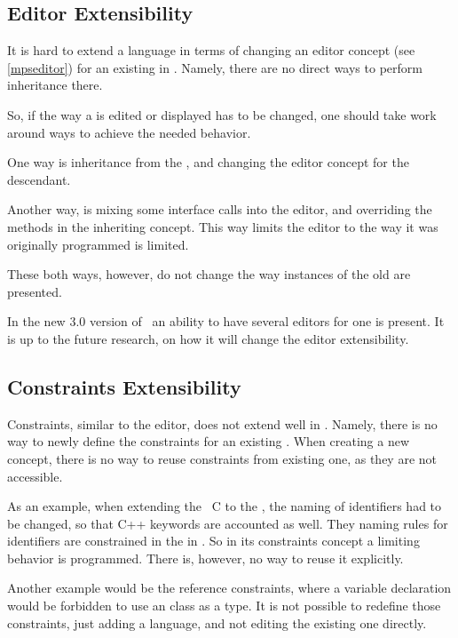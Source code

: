 \subsection{Editor Extensibility} 

It is hard to extend a language in terms of changing an editor concept (see \ref{mpseditor}) for an existing  in \jbmps.
Namely, there are no direct ways to perform inheritance there. 

So, if the way a  is edited or displayed has to be 
changed, one should take work around ways to achieve the needed behavior. 

One way is inheritance from the , and changing the editor concept for the descendant.

Another way, is mixing some interface calls into the editor, and overriding the methods in the inheriting concept.
This way limits the editor to the way it was originally programmed is limited.

These both ways, however, do not change the way instances of the old  are presented.

In the new 3.0 version of \jbmps\ an ability to have several editors for one  is present. It is 
up to the future research, on how it will change the editor extensibility.

\subsection{Constraints Extensibility}

Constraints, similar to the editor, does not extend well in \jbmps. Namely, there is no way to newly define the constraints
for an existing . When creating a new concept, there is no way to reuse constraints from existing one, as they 
are not accessible.

As an example, when extending the \mbdr\ C to the \pcpp, the naming of identifiers had to be changed, so that C++ keywords
are accounted as well. They naming rules for identifiers are constrained in the  in \mbdr.
So in its constraints concept a limiting behavior is programmed. There is, however, no way to reuse it explicitly.

Another example would be the reference constraints, where a variable declaration would be forbidden to use an  class
as a type. It is not possible to redefine those constraints, just adding a language, and not editing the existing one directly.

